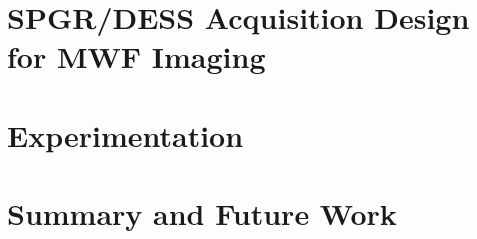 
\section{SPGR/DESS Acquisition Design for MWF Imaging}
\label{s,mwf,acq}


\section{Experimentation}
\label{s,mwf,exp}


\section{Summary and Future Work}
\label{s,mwf,summ}

